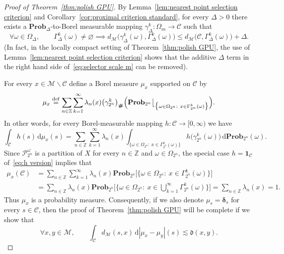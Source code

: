 \documentclass[11pt,reqno]{amsart}
\renewcommand{\le}{\leqslant}
\renewcommand{\setminus}{\smallsetminus}
\newcommand{\ud}[0]{\,\mathrm{d}}
\newcommand{\bd}{\boldsymbol{\delta}}
\renewcommand{\bd}{\boldsymbol{\delta}}
\theoremstyle{remark}
\newcommand{\MM}{\mathcal{M}}
\newcommand{\Z}{\mathbb Z}
\newcommand{\eqdef}{\stackrel{\mathrm{def}}{=}}
\renewcommand{\Pr}{\mathbf{Prob}}
\renewcommand{\emptyset}{\varnothing}
\newcommand{\sub}{\mathscr{C}}
\renewcommand{\1}{\mathbf 1}
\newcommand{\Part}{\mathscr{P}}
\begin{document}
\begin{proof}[Proof of Theorem~\ref{thm:polish GPU}] By Lemma~\ref{lem:nearest point selection criterion} and Corollary~\ref{cor:proximal criterion standard}, for every $\Delta>0$ there exists a $\Pr_\Delta$-to-Borel measurable mapping $\gamma_\Delta^k:\Omega_{m}\to \sub$ such that
 \begin{equation}\label{eq:selector scale m}
 \forall  \omega\in \Omega_{\Delta},\qquad \Gamma_\Delta^k(\omega)\neq\emptyset \implies        d_{\MM}\big(\gamma_\Delta^k(\omega),\Gamma_\Delta^k(\omega)\big)\le d_{\MM}\big(\sub,\Gamma_\Delta^k(\omega)\big)+\Delta.
\end{equation}
(In fact, in the locally compact setting of Theorem~\ref{thm:polish GPU}, the use of Lemma~\ref{lem:nearest point selection criterion}  shows that the additive $\Delta$ term in the right hand side of~\eqref{eq:selector scale m} can be removed).



For every $x\in \MM\setminus \sub$ define a Borel measure $\mu_x$ supported on $\sub$ by
\begin{equation}\label{eq:def mu x}
\mu_x\eqdef \sum_{n\in \Z}\sum_{k=1}^\infty \lambda_n(x) \big(\gamma_{2^n}^k\big)_{\textbf \#}\Big(\Pr_{2^n}\bigl\lfloor_{\big\{\omega\in \Omega_{2^n}:\ x\in \Gamma_{2^n}^k(\omega)\big\}}\Big).
\end{equation}
In other words, for every Borel-measurable mapping $h:\sub\to [0,\infty)$ we have
\begin{equation}\label{eq:h version}
\int_\sub h(s)\ud\mu_x(s)= \sum_{n\in \Z}\sum_{k=1}^\infty \lambda_n(x)\int_{\big\{\omega\in \Omega_{2^n}:\ x\in \Gamma_{2^n}^k(\omega)\big\}}h\big(\gamma_{2^n}^k(\omega)\big)\ud\Pr_{2^n}(\omega).
\end{equation}
Since $\Part^\omega_{2^n}$ is a partition of $X$ for every $n\in \Z$ and  $\omega\in \Omega_{2^n}$, the special case $h=\1_\sub$ of~\eqref{eq:h version} implies  that
\begin{align*}
\mu_x(\sub)&= \sum_{n\in \Z}\sum_{k=1}^\infty \lambda_n(x)\Pr_{2^n}\Big[\big\{\omega\in \Omega_{2^n}:\ x\in \Gamma_{2^n}^k(\omega)\big\}\Big]
\\&=\sum_{n\in \Z} \lambda_n(x)\Pr_{2^n}\Big[\big\{\omega\in \Omega_{2^n}:\ x\in \bigcup_{k=1}^\infty\Gamma_{2^n}^k(\omega)\big\}\Big]=\sum_{n\in \Z}\lambda_n(x)=1.
\end{align*}
Thus $\mu_x$ is a probability measure.  Consequently,  if we also denote $\mu_s=\bd_s$ for every $s\in \sub$, then the proof of Theorem~\ref{thm:polish GPU} will be complete if we show that
\begin{equation}\label{eq:goal gpu}
\forall  x,y\in \MM,\qquad \int_\sub d_{\MM}(s,x)\ud|\mu_x-\mu_y|(s)\lesssim \mathfrak{d}(x,y).
\end{equation}


\end{proof}
\end{document}
